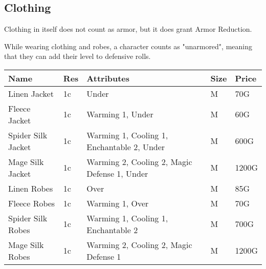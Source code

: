 \subsection{Clothing}\label{subsec:clothing}

Clothing in itself does not count as armor, but it does grant Armor Reduction.

While wearing clothing and robes, a character counts as "unarmored", meaning that they can add their level to defensive rolls.

\begin{longtable}{p{3cm} | p{1.5cm} | p{5cm} | p{1cm} | p{1.5cm}}
	Name & Res &   Attributes & Size & Price\\ \hline
	Linen Jacket & 1c & Under & M & 70G\\
	
	Fleece Jacket & 1c & Warming 1, Under & M & 60G\\
	
	Spider Silk Jacket & 1c & Warming 1, Cooling 1, Enchantable 2, Under & M & 600G\\
	
	Mage Silk Jacket & 1c & Warming 2, Cooling 2, Magic Defense 1, Under & M & 1200G\\
	
	Linen Robes & 1c & Over & M & 85G\\
	
	Fleece Robes & 1c & Warming 1, Over & M & 70G\\

	Spider Silk Robes & 1c & Warming 1, Cooling 1, Enchantable 2 & M & 700G\\
	
	Mage Silk Robes & 1c & Warming 2, Cooling 2, Magic Defense 1 & M & 1200G\\
\end{longtable}